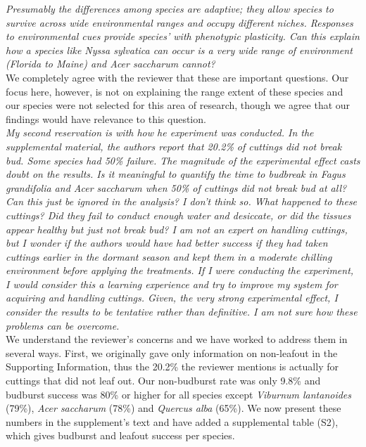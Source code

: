 \documentclass[11pt,a4paper]{article}
\begin{document}
\emph{Presumably the differences among species are adaptive; they allow
species to survive across wide environmental ranges and occupy different niches.  Responses
to environmental cues provide species’ with phenotypic plasticity.  Can this explain how a
species like Nyssa sylvatica can occur is a very wide range of environment (Florida to Maine)
and Acer saccharum cannot?}\\

We completely agree with the reviewer that these are important questions. Our focus here, however, is not on explaining the range extent of these species and our species were not selected for this area of research, though we agree that our findings would have relevance to this question. \\

\emph{My second reservation is with how he experiment was conducted. In the supplemental material,
the authors report that 20.2\% of cuttings did not break bud. Some species had 50\% failure.
The magnitude of the experimental effect casts doubt on the results.  Is it meaningful to
quantify the time to budbreak in Fagus grandifolia and Acer saccharum when 50\% of cuttings
did not break bud at all?  Can this just be ignored in the analysis?  I don’t think so. What
happened to these cuttings?  Did they fail to conduct enough water and desiccate, or did the
tissues appear healthy but just not break bud? I am not an expert on handling cuttings, but I
wonder if the authors would have had better success if they had taken cuttings earlier in the
dormant season and kept them in a moderate chilling environment before applying the
treatments. If I were conducting the experiment, I would consider this a learning experience
and try to improve my system for acquiring and handling cuttings.  Given, the very strong
experimental effect, I consider the results to be tentative rather than definitive. I am not
sure how these problems can be overcome.}\\

We understand the reviewer's concerns and we have worked to address them in several ways. First, we originally gave only information on non-leafout in the Supporting Information, thus the 20.2\% the reviewer mentions is actually for cuttings that did not leaf out. Our non-budburst rate was only 9.8\% and budburst success was 80\% or higher for all species except \emph{Viburnum lantanoides} (79\%), \emph{Acer saccharum} (78\%) and \emph{Quercus alba} (65\%). We now present these numbers in the supplement's text and have added a supplemental table (S2), which gives budburst and leafout success per species. \\
\end{document}
